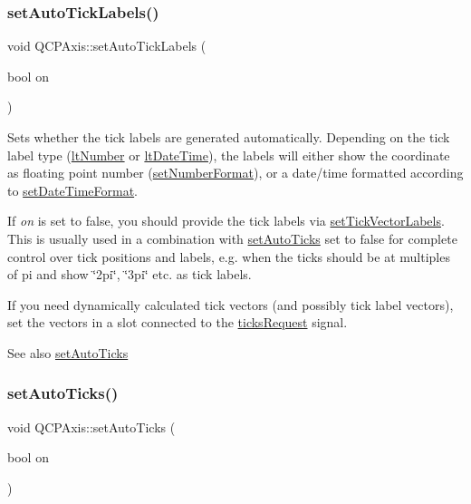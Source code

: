 \subsubsection{\texorpdfstring{set\+Auto\+Tick\+Labels()}{setAutoTickLabels()}}
{\footnotesize\ttfamily void Q\+C\+P\+Axis\+::set\+Auto\+Tick\+Labels (\begin{DoxyParamCaption}\item[{bool}]{on }\end{DoxyParamCaption})}

Sets whether the tick labels are generated automatically. Depending on the tick label type (\mbox{\hyperlink{class_q_c_p_axis_a4a7da0166f755f5abac23b765d184cada7f1eacf3b73adaefd334bea04e094b7e}{lt\+Number}} or \mbox{\hyperlink{class_q_c_p_axis_a4a7da0166f755f5abac23b765d184cadafc70594a9d877124dd11ccc187d4ac52}{lt\+Date\+Time}}), the labels will either show the coordinate as floating point number (\mbox{\hyperlink{class_q_c_p_axis_ae585a54dc2aac662e90a2ca82f002590}{set\+Number\+Format}}), or a date/time formatted according to \mbox{\hyperlink{class_q_c_p_axis_a2ee0191daa03524a682113e63e05f7a7}{set\+Date\+Time\+Format}}.

If {\itshape on} is set to false, you should provide the tick labels via \mbox{\hyperlink{class_q_c_p_axis_a921d3ba3853ca3bd2cce3459f7a243ed}{set\+Tick\+Vector\+Labels}}. This is usually used in a combination with \mbox{\hyperlink{class_q_c_p_axis_ae867c23d3a6a7bd4d09cc66c5d018f63}{set\+Auto\+Ticks}} set to false for complete control over tick positions and labels, e.\+g. when the ticks should be at multiples of pi and show \char`\"{}2pi\char`\"{}, \char`\"{}3pi\char`\"{} etc. as tick labels.

If you need dynamically calculated tick vectors (and possibly tick label vectors), set the vectors in a slot connected to the \mbox{\hyperlink{class_q_c_p_axis_af46d99613d29518795134ec4928e3873}{ticks\+Request}} signal.

\begin{DoxySeeAlso}{See also}
\mbox{\hyperlink{class_q_c_p_axis_ae867c23d3a6a7bd4d09cc66c5d018f63}{set\+Auto\+Ticks}} 
\end{DoxySeeAlso}
\mbox{\label{class_q_c_p_axis_ae867c23d3a6a7bd4d09cc66c5d018f63}} 
\subsubsection{\texorpdfstring{set\+Auto\+Ticks()}{setAutoTicks()}}
{\footnotesize\ttfamily void Q\+C\+P\+Axis\+::set\+Auto\+Ticks (\begin{DoxyParamCaption}\item[{bool}]{on }\end{DoxyParamCaption})}

